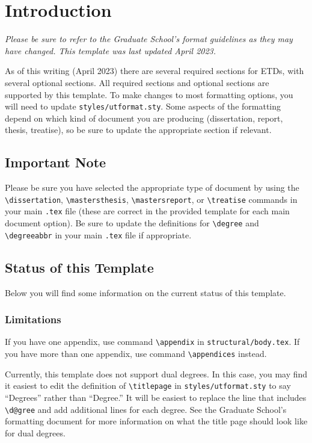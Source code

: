 \chapter{Introduction}
\emph{Please be sure to refer to the Graduate School's format guidelines as they may have changed. This template was last updated April 2023.}

As of this writing (April 2023) there are several required sections for ETDs, with several optional sections. All required sections and optional sections are supported by this template. To make changes to most formatting options, you will need to update \verb|styles/utformat.sty|. Some aspects of the formatting depend on which kind of document you are producing (dissertation, report, thesis, treatise), so be sure to update the appropriate section if relevant.

\section{Important Note}
Please be sure you have selected the appropriate type of document by using the \verb|\dissertation|, \verb|\mastersthesis|, \verb|\mastersreport|, or \verb|\treatise| commands in your main \verb|.tex| file (these are correct in the provided template for each main document option). Be sure to update the definitions for \verb|\degree| and \verb|\degreeabbr| in your main \verb|.tex| file if appropriate.

\section{Status of this Template}
Below you will find some information on the current status of this template.
\subsection{Limitations}
If you have one appendix, use command \verb|\appendix| in \verb|structural/body.tex|. If you have more than one appendix, use command \verb|\appendices| instead.

Currently, this template does not support dual degrees. In this case, you may find it easiest to edit the definition of \verb|\titlepage| in \verb|styles/utformat.sty| to say ``Degrees'' rather than ``Degree.'' It will be easiest to replace the line that includes \verb|\d@gree| and add additional lines for each degree. See the Graduate School's formatting document for more information on what the title page should look like for dual degrees.

